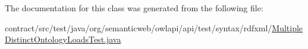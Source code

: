 The documentation for this class was generated from the following file\-:\begin{DoxyCompactItemize}
\item 
contract/src/test/java/org/semanticweb/owlapi/api/test/syntax/rdfxml/\hyperlink{_multiple_distinct_ontology_loads_test_8java}{Multiple\-Distinct\-Ontology\-Loads\-Test.\-java}\end{DoxyCompactItemize}
